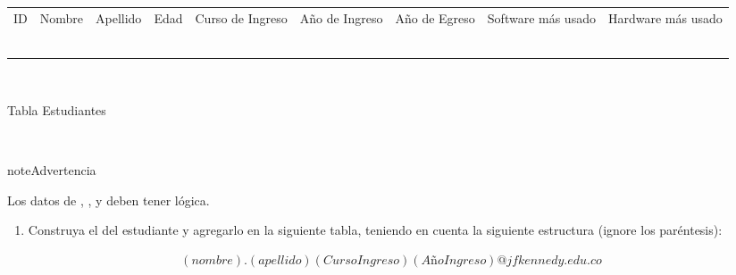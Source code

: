 \documentclass[letterpaper,10pt,spanish]{sphinxmanual}
\begin{document}
\begin{savenotes}\sphinxattablestart
\sphinxthistablewithglobalstyle
\centering
\begin{tabular}[t]{*{1}{}}
\sphinxtoprule
\sphinxtableatstartofbodyhook

\begin{savenotes}\sphinxattablestart
\sphinxthistablewithglobalstyle
\centering
\begin{tabulary}{\linewidth}[t]{TTTTTTTTT}
\sphinxtoprule
\sphinxstyletheadfamily 
\sphinxAtStartPar
ID
&\sphinxstyletheadfamily 
\sphinxAtStartPar
Nombre
&\sphinxstyletheadfamily 
\sphinxAtStartPar
Apellido
&\sphinxstyletheadfamily 
\sphinxAtStartPar
Edad
&\sphinxstyletheadfamily 
\sphinxAtStartPar
Curso de Ingreso
&\sphinxstyletheadfamily 
\sphinxAtStartPar
Año de Ingreso
&\sphinxstyletheadfamily 
\sphinxAtStartPar
Año de Egreso
&\sphinxstyletheadfamily 
\sphinxAtStartPar
Software más usado
&\sphinxstyletheadfamily 
\sphinxAtStartPar
Hardware más usado
\\
\sphinxmidrule
\sphinxtableatstartofbodyhook
{}
&&&&&&&&\\
\sphinxhline
{}
&&&&&&&&\\
\sphinxhline
{}
&&&&&&&&\\
\sphinxhline
{}
&&&&&&&&\\
\sphinxhline
{}
&&&&&&&&\\
\sphinxbottomrule
\end{tabulary}
\sphinxtableafterendhook\par
\sphinxattableend\end{savenotes}
\\
\sphinxhline
\begin{center}Tabla Estudiantes
\end{center}\\
\sphinxbottomrule
\end{tabular}
\sphinxtableafterendhook\par
\sphinxattableend\end{savenotes}

\begin{sphinxadmonition}{note}{Advertencia}

\sphinxAtStartPar
Los datos de , ,  y  deben tener lógica.
\end{sphinxadmonition}
\begin{enumerate}
%
\setcounter{enumi}{7}
\item {} 
\sphinxAtStartPar
Construya el  del estudiante y agregarlo en la siguiente tabla, teniendo en cuenta la siguiente estructura (ignore los paréntesis):

\end{enumerate}
\begin{equation*}
\begin{split}
(nombre).(apellido)(CursoIngreso)(AñoIngreso)@jfkennedy.edu.co
\end{split}
\end{equation*}
\end{document}
